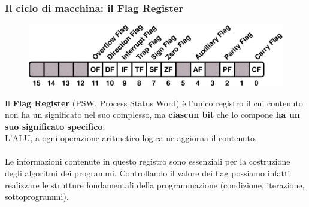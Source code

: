 \begin{frame}
	\frametitle{Il ciclo di macchina: il Flag Register}
	
	\begin{figure}[!htbp] 
		\centering
		\includegraphics[width=0.7\linewidth]{images/4_cpu/flag_register.pdf}
		\label{fig:cpu_complex}
	\end{figure}
	
	Il \textbf{Flag Register} (PSW, Process Status Word) è l'unico registro il cui contenuto non ha un significato nel suo complesso, ma \textbf{ciascun bit} che lo compone \textbf{ha un suo significato specifico}.\\
	\underline{L’ALU, a ogni operazione aritmetico-logica ne aggiorna il contenuto}.\\~\\
	Le informazioni contenute in questo registro sono essenziali per la costruzione degli algoritmi dei programmi. Controllando il valore dei flag possiamo infatti realizzare le strutture fondamentali della programmazione (condizione, iterazione, sottoprogrammi).
	 
\end{frame}


